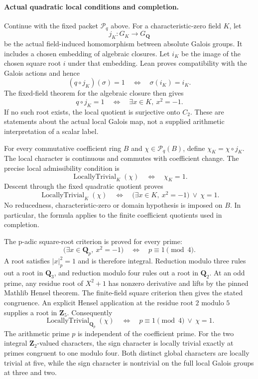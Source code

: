 \documentclass[11pt]{article}
\theoremstyle{definition}
\theoremstyle{remark}
\newcommand{\Z}{\mathbf Z}
\newcommand{\Q}{\mathbf Q}
\begin{document}
\paragraph{Actual quadratic local conditions and completion.}\label{book:x-construction-22}
Continue with the fixed packet $\mathcal P_q$ above. For a
characteristic-zero field $K$, let
\[
j_K:G_K\longrightarrow G_{\Q}
\]
be the actual field-induced homomorphism between absolute Galois groups.
It includes a chosen embedding of algebraic closures. Let $i_K$ be the
image of the chosen square root $i$ under that embedding. Lean proves
compatibility with the Galois actions and hence
\[
(q\circ j_K)(\sigma)=1
\quad\Longleftrightarrow\quad \sigma(i_K)=i_K.
\]
The fixed-field theorem for the algebraic closure then gives
\[
q\circ j_K=1
\quad\Longleftrightarrow\quad
\exists x\in K,\ x^2=-1.
\]
If no such root exists, the local quotient is surjective onto $C_2$.
These are statements about the actual local Galois map, not a supplied
arithmetic interpretation of a scalar label.

For every commutative coefficient ring $B$ and $\chi\in\mathcal P_q(B)$,
define $\chi_K=\chi\circ j_K$. The local character is continuous and
commutes with coefficient change. The precise local admissibility
condition is
\[
\operatorname{LocallyTrivial}_K(\chi)
\quad\Longleftrightarrow\quad \chi_K=1.
\]
Descent through the fixed quadratic quotient proves
\[
\operatorname{LocallyTrivial}_K(\chi)
\quad\Longleftrightarrow\quad
\bigl(\exists x\in K,\ x^2=-1\bigr)\ \lor\ \chi=1.
\]
No reducedness, characteristic-zero or domain hypothesis is imposed on
$B$. In particular, the formula applies to the finite coefficient
quotients used in completion.

The p-adic square-root criterion is proved for every prime:
\[
\bigl(\exists x\in\Q_p,\ x^2=-1\bigr)
\quad\Longleftrightarrow\quad p\equiv1\pmod4.
\]
A root satisfies $\lvert x\rvert_p^2=1$ and is therefore integral.
Reduction modulo three rules out a root in $\Q_3$, and reduction modulo
four rules out a root in $\Q_2$. At an odd prime, any residue root of
$X^2+1$ has nonzero derivative and lifts by the pinned Mathlib Hensel
theorem. The finite-field square criterion then gives the stated
congruence. An explicit Hensel application at the residue root $2$ modulo $5$ supplies
a root in $\Z_5$. Consequently
\[
\boxed{
\operatorname{LocallyTrivial}_{\Q_p}(\chi)
\quad\Longleftrightarrow\quad p\equiv1\pmod4\ \lor\ \chi=1.
}
\]
The arithmetic prime $p$ is independent of the coefficient prime. For
the two integral $\Z_2$-valued characters, the sign character is locally
trivial exactly at primes congruent to one modulo four. Both distinct
global characters are locally trivial at five, while the sign character
is nontrivial on the full local Galois groups at three and two.
\end{document}
